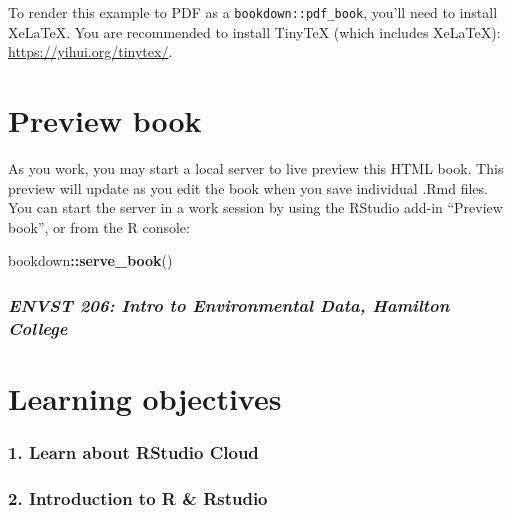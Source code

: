 \documentclass[
]{book}
\newenvironment{Shaded}{\begin{snugshade}}{\end{snugshade}}
\newcommand{\FunctionTok}[1]{\textcolor[rgb]{0.13,0.29,0.53}{\textbf{#1}}}
\newcommand{\NormalTok}[1]{#1}
\newcommand{\SpecialCharTok}[1]{\textcolor[rgb]{0.81,0.36,0.00}{\textbf{#1}}}
\theoremstyle{definition}
\theoremstyle{definition}
\theoremstyle{definition}
\theoremstyle{definition}
\theoremstyle{remark}
\begin{document}
To render this example to PDF as a \texttt{bookdown::pdf\_book}, you'll need to install XeLaTeX. You are recommended to install TinyTeX (which includes XeLaTeX): \url{https://yihui.org/tinytex/}.

\hypertarget{preview-book}{%
\section{Preview book}\label{preview-book}}

As you work, you may start a local server to live preview this HTML book. This preview will update as you edit the book when you save individual .Rmd files. You can start the server in a work session by using the RStudio add-in ``Preview book'', or from the R console:

\begin{Shaded}
\begin{Highlighting}[]
\NormalTok{bookdown}\SpecialCharTok{::}\FunctionTok{serve\_book}\NormalTok{()}
\end{Highlighting}
\end{Shaded}

\hypertarget{envst-206-intro-to-environmental-data-hamilton-college}{%
\subsubsection{\texorpdfstring{\emph{ENVST 206: Intro to Environmental Data, Hamilton College}}{ENVST 206: Intro to Environmental Data, Hamilton College}}\label{envst-206-intro-to-environmental-data-hamilton-college}}

\hypertarget{learning-objectives}{%
\section{Learning objectives}\label{learning-objectives}}

\hypertarget{learn-about-rstudio-cloud}{%
\subsubsection{1. Learn about RStudio Cloud}\label{learn-about-rstudio-cloud}}

\hypertarget{introduction-to-r-rstudio}{%
\subsubsection{2. Introduction to R \& Rstudio}\label{introduction-to-r-rstudio}}
\end{document}
